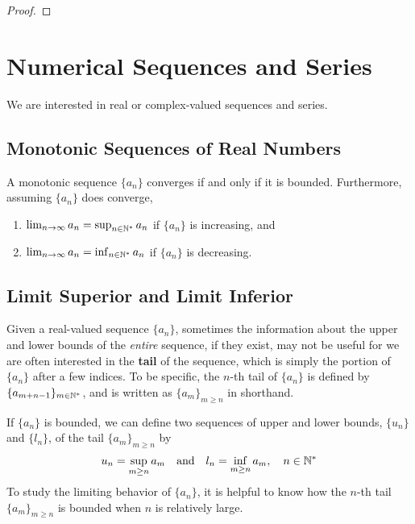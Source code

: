 \documentclass[thmcnt=section, 12pt]{my-elegantbook}
\begin{document}
\begin{proof}
\end{proof}



\chapter{Numerical Sequences and Series}

We are interested in real or complex-valued sequences and series.


\section{Monotonic Sequences of Real Numbers}

\begin{theorem} \label{thm:57}
    A monotonic sequence $\{a_n\}$ converges if and only if it is bounded. Furthermore, assuming $\{a_n\}$ does converge,
    \begin{enumerate}
        \item $\lim_{n \to \infty} a_n = \sup_{n \in \mathbb{N}^\ast} a_n$ if $\{a_n\}$ is increasing, and
        \item $\lim_{n \to \infty} a_n = \inf_{n \in \mathbb{N}^\ast} a_n$ if $\{a_n\}$ is decreasing.
    \end{enumerate}
\end{theorem}


\section{Limit Superior and Limit Inferior}

Given a real-valued sequence $\{a_n\}$, sometimes the information about the upper and lower bounds of the \textit{entire} sequence, if they exist, may not be useful for we are often interested in the \textbf{tail} of the sequence, which is simply the portion of $\{a_n\}$ after a few indices. To be  specific, the $n$-th tail of $\{a_n\}$ is defined by $\{a_{m+n-1}\}_{m \in \mathbb{N}^\ast}$, and is written as $\{a_m\}_{m \geq n}$ in shorthand.

If $\{a_n\}$ is bounded, we can define two sequences of upper and lower bounds, $\{u_n\}$ and $\{l_n\}$, of the tail $\{a_m\}_{m \geq n}$ by
\begin{align*}
    u_n = \sup_{m \geq n} a_m
    \quad \text{and} \quad
    l_n = \inf_{m \geq n} a_m,
    \quad n \in \mathbb{N}^\ast
\end{align*}
To study the limiting behavior of $\{a_n\}$, it is helpful to know how the $n$-th tail $\{a_m\}_{m \geq n}$ is bounded when $n$ is relatively large.
\end{document}
